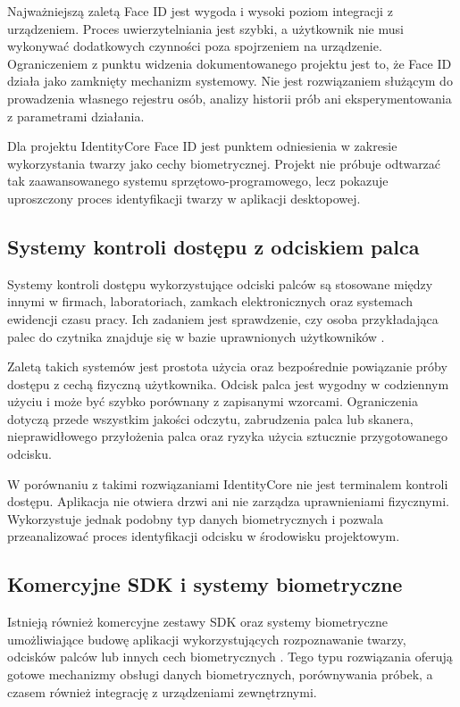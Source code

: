 Najważniejszą zaletą Face ID jest wygoda i wysoki poziom integracji z urządzeniem. Proces uwierzytelniania jest szybki, a użytkownik nie musi wykonywać dodatkowych czynności poza spojrzeniem na urządzenie. Ograniczeniem z punktu widzenia dokumentowanego projektu jest to, że Face ID działa jako zamknięty mechanizm systemowy. Nie jest rozwiązaniem służącym do prowadzenia własnego rejestru osób, analizy historii prób ani eksperymentowania z parametrami działania.

Dla projektu IdentityCore Face ID jest punktem odniesienia w zakresie wykorzystania twarzy jako cechy biometrycznej. Projekt nie próbuje odtwarzać tak zaawansowanego systemu sprzętowo-programowego, lecz pokazuje uproszczony proces identyfikacji twarzy w aplikacji desktopowej.

\subsection{Systemy kontroli dostępu z odciskiem palca}

Systemy kontroli dostępu wykorzystujące odciski palców są stosowane między innymi w firmach, laboratoriach, zamkach elektronicznych oraz systemach ewidencji czasu pracy. Ich zadaniem jest sprawdzenie, czy osoba przykładająca palec do czytnika znajduje się w bazie uprawnionych użytkowników \cite{fingerprintaccess}.

Zaletą takich systemów jest prostota użycia oraz bezpośrednie powiązanie próby dostępu z cechą fizyczną użytkownika. Odcisk palca jest wygodny w codziennym użyciu i może być szybko porównany z zapisanymi wzorcami. Ograniczenia dotyczą przede wszystkim jakości odczytu, zabrudzenia palca lub skanera, nieprawidłowego przyłożenia palca oraz ryzyka użycia sztucznie przygotowanego odcisku.

W porównaniu z takimi rozwiązaniami IdentityCore nie jest terminalem kontroli dostępu. Aplikacja nie otwiera drzwi ani nie zarządza uprawnieniami fizycznymi. Wykorzystuje jednak podobny typ danych biometrycznych i pozwala przeanalizować proces identyfikacji odcisku w środowisku projektowym.

\subsection{Komercyjne SDK i systemy biometryczne}

Istnieją również komercyjne zestawy SDK oraz systemy biometryczne umożliwiające budowę aplikacji wykorzystujących rozpoznawanie twarzy, odcisków palców lub innych cech biometrycznych \cite{biometricsdk}. Tego typu rozwiązania oferują gotowe mechanizmy obsługi danych biometrycznych, porównywania próbek, a czasem również integrację z urządzeniami zewnętrznymi.

